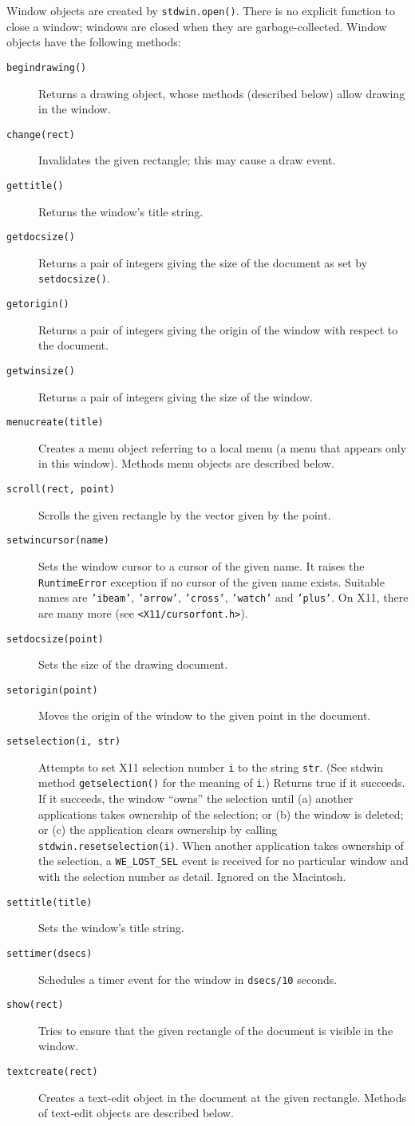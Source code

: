 Window objects are created by
{\tt stdwin.open()}.
There is no explicit function to close a window; windows are closed when
they are garbage-collected.
Window objects have the following methods:
\begin{description}
\item[{\tt begindrawing()}]
Returns a drawing object, whose methods (described below) allow drawing
in the window.
\item[{\tt change(rect)}]
Invalidates the given rectangle; this may cause a draw event.
\item[{\tt gettitle()}]
Returns the window's title string.
\item[{\tt getdocsize()}]
Returns a pair of integers giving the size of the document as set by
{\tt setdocsize()}.
\item[{\tt getorigin()}]
Returns a pair of integers giving the origin of the window with respect
to the document.
\item[{\tt getwinsize()}]
Returns a pair of integers giving the size of the window.
\item[{\tt menucreate(title)}]
Creates a menu object referring to a local menu (a menu that appears
only in this window).
Methods menu objects are described below.
\item[{\tt scroll(rect,~point)}]
Scrolls the given rectangle by the vector given by the point.
\item[{\tt setwincursor(name)}]
Sets the window cursor to a cursor of the given name.
It raises the
{\tt Runtime\-Error}
exception if no cursor of the given name exists.
Suitable names are
{\tt 'ibeam'},
{\tt 'arrow'},
{\tt 'cross'},
{\tt 'watch'}
and
{\tt 'plus'}.
On X11, there are many more (see
{\tt <X11/cursorfont.h>}).
\item[{\tt setdocsize(point)}]
Sets the size of the drawing document.
\item[{\tt setorigin(point)}]
Moves the origin of the window to the given point in the document.
\item[{\tt setselection(i, str)}]
Attempts to set X11 selection number
{\tt i}
to the string
{\tt str}.
(See stdwin method
{\tt getselection()}
for the meaning of
{\tt i}.)
Returns true if it succeeds.
If it succeeds, the window ``owns'' the selection until
(a) another applications takes ownership of the selection; or
(b) the window is deleted; or
(c) the application clears ownership by calling
{\tt stdwin.resetselection(i)}.
When another application takes ownership of the selection, a
{\tt WE\_LOST\_SEL}
event is received for no particular window and with the selection number
as detail.
Ignored on the Macintosh.
\item[{\tt settitle(title)}]
Sets the window's title string.
\item[{\tt settimer(dsecs)}]
Schedules a timer event for the window in
{\tt dsecs/10}
seconds.
\item[{\tt show(rect)}]
Tries to ensure that the given rectangle of the document is visible in
the window.
\item[{\tt textcreate(rect)}]
Creates a text-edit object in the document at the given rectangle.
Methods of text-edit objects are described below.
\end{description}

